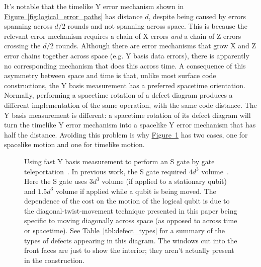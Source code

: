 \documentclass[onecolumn,unpublished,a4paper]{quantumarticle}
\theoremstyle{definition}
\theoremstyle{definition}
\theoremstyle{definition}
\newcommand{\fig}[1]{\hyperref[fig:#1]{Figure~\ref*{fig:#1}}}
\newcommand{\tbl}[1]{\hyperref[tbl:#1]{Table~\ref*{tbl:#1}}}
\begin{document}
It's notable that the timelike Y error mechanism shown in \fig{logical_error_paths} has distance $d$, despite being caused by errors spanning across $d/2$ rounds and not spanning across space.
This is because the relevant error mechanism requires a chain of X errors \emph{and} a chain of Z errors crossing the $d/2$ rounds.
Although there are error mechanisms that grow X and Z error chains together across space (e.g. Y basis data errors), there is apparently no corresponding mechanism that does this across time.
A consequence of this asymmetry between space and time is that, unlike most surface code constructions, the Y basis measurement has a preferred spacetime orientation.
Normally, performing a spacetime rotation of a defect diagram produces a different implementation of the same operation, with the same code distance.
The Y basis measurement is different: a spacetime rotation of its defect diagram will turn the timelike Y error mechanism into a spacelike Y error mechanism that has half the distance.
Avoiding this problem is why \fig{other_improvements} has two cases, one for spacelike motion and one for timelike motion.

\begin{figure}
    \centering
    \caption{
        Using fast Y basis measurement to perform an S gate by gate teleportation~\cite{gottesman1999gateteleport}.
        In previous work, the S gate required $4 d^3$  volume~\cite{bombin2021logical,chamberland2022universal}.
        Here the S gate uses $3 d^3$ volume (if applied to a stationary qubit) and $1.5d^3$ volume if applied while a qubit is being moved.
        The dependence of the cost on the motion of the logical qubit is due to the diagonal-twist-movement technique presented in this paper being specific to moving diagonally across space (as opposed to across time or spacetime).
        See \tbl{defect_types} for a summary of the types of defects appearing in this diagram.
        The windows cut into the front faces are just to show the interior; they aren't actually present in the construction.
    }
    \label{fig:other_improvements}
\end{figure}
\end{document}
